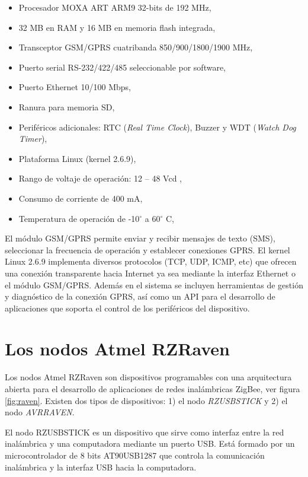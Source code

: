 \begin{itemize}
	\item Procesador MOXA ART ARM9 32-bits de 192 MHz,
	\item 32 MB en RAM y 16 MB en memoria flash integrada, 
	\item Transceptor GSM/GPRS cuatribanda 850/900/1800/1900 MHz,
	\item Puerto serial RS-232/422/485 seleccionable por software, 
	\item Puerto Ethernet 10/100 Mbps,
	\item Ranura para memoria SD,
	\item Periféricos adicionales: RTC (\textit{Real Time Clock}), Buzzer y WDT (\textit{Watch Dog Timer}),
	\item Plataforma Linux (kernel 2.6.9),
	\item Rango de voltaje de operación:  12 -- 48 Vcd ,
	\item Consumo de corriente de 400 mA, 
	\item Temperatura de operaci\'on de -10$^{\circ}$ a 60$^{\circ}$ C, 
\end{itemize}

El módulo GSM/GPRS permite enviar y recibir mensajes de texto (SMS), seleccionar la frecuencia de operación y establecer conexiones GPRS. El kernel Linux 2.6.9 implementa diversos protocolos (TCP, UDP, ICMP, etc) que ofrecen una conexión transparente hacia Internet ya sea mediante la interfaz Ethernet o el módulo GSM/GPRS. Además en el sistema se incluyen herramientas de gestión y diagnóstico de la conexión GPRS, así como un API para el desarrollo de aplicaciones que soporta el control de los periféricos del dispositivo. 

\section{Los nodos Atmel RZRaven}

Los nodos Atmel RZRaven\cite{rel:raven} son dispositivos programables con una arquitectura abierta para el desarrollo de aplicaciones de redes inalámbricas ZigBee, ver figura \ref{fig:raven}. Existen dos tipos de dispositivos: 1) el nodo \textit{RZUSBSTICK} y 2) el nodo \textit{AVRRAVEN}. 

El nodo RZUSBSTICK es un dispositivo que sirve como interfaz entre la red inalámbrica y una computadora mediante un puerto USB. Está formado por un microcontrolador de 8 bits AT90USB1287 que controla la comunicación inalámbrica y la interfaz USB hacia la computadora. 

